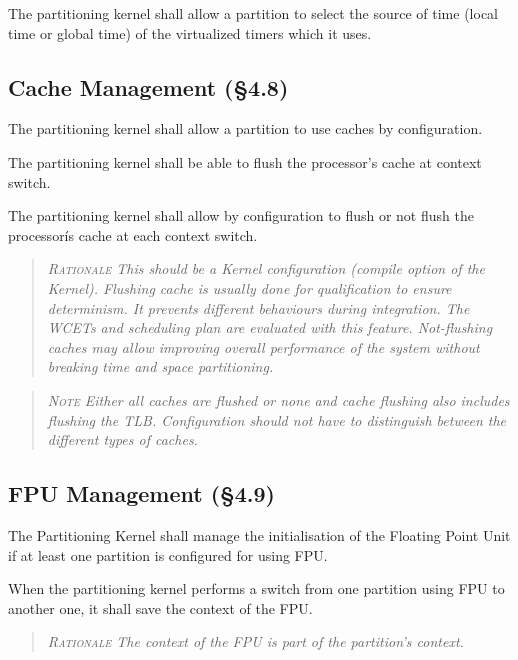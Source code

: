 The partitioning kernel shall allow a partition to select the source of time (local time or global time) of the virtualized timers which it uses.

\subsection{Cache Management (\S4.8)}

The partitioning kernel shall allow a partition to use caches by configuration.

The partitioning kernel shall be able to flush the processor's cache at context switch.

The partitioning kernel shall allow by configuration to flush or not flush the processorís cache at each context switch.
\begin{quote}\it
\textsc{Rationale}
This should be a Kernel configuration (compile option of the Kernel).
Flushing cache is usually done for qualification to ensure determinism. It prevents different behaviours during integration. The WCETs and scheduling plan are evaluated with this feature.
Not-flushing caches may allow improving overall performance of the system without breaking time and space partitioning.
\end{quote}
\begin{quote}\it
\textsc{Note}
Either all caches are flushed or none and cache flushing also includes flushing the TLB. Configuration should not have to distinguish between the different types of caches.
\end{quote}

\subsection{FPU Management (\S4.9)}

The Partitioning Kernel shall manage the initialisation of the Floating Point Unit if at least one partition is configured for using FPU.

When the partitioning kernel performs a switch from one partition using FPU to another one, it shall save the context of the FPU.
\begin{quote}\it
\textsc{Rationale}
The context of the FPU is part of the partition's context.
\end{quote}

